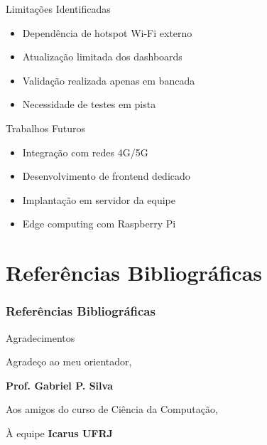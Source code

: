 \documentclass{beamer}
\begin{document}
\begin{frame}{Limitações Identificadas}

\begin{itemize}
    \item Dependência de hotspot Wi-Fi externo
    \item Atualização limitada dos dashboards
    \item Validação realizada apenas em bancada
    \item Necessidade de testes em pista
\end{itemize}

\end{frame}

\begin{frame}{Trabalhos Futuros}

\begin{itemize}
    \item Integração com redes 4G/5G
    \item Desenvolvimento de frontend dedicado
    \item Implantação em servidor da equipe
    \item Edge computing com Raspberry Pi
\end{itemize}

\end{frame}



\section{Referências Bibliográficas}

\begin{frame}[allowframebreaks]
    \frametitle{Referências Bibliográficas}

    \nocite{*}

    
    
\end{frame}

\begin{frame}{Agradecimentos}

Agradeço ao meu orientador,

\vspace{0.2cm}

\textbf{Prof. Gabriel P. Silva}

\vspace{0.2cm}

Aos amigos do curso de Ciência da Computação,

\vspace{0.3cm}

À equipe \textbf{Icarus UFRJ}


\end{frame}

\backmatter
\end{document}
